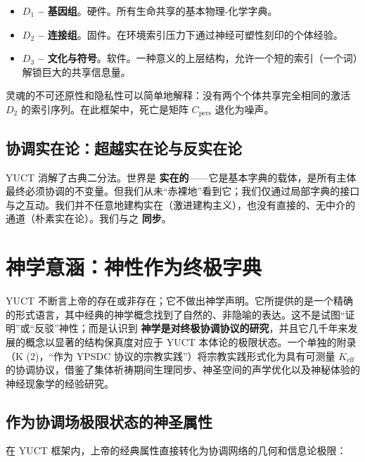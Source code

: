 \documentclass[12pt,a4paper]{article}
\begin{document}
	\begin{itemize}[leftmargin=*]
		\item \textbf{\(D_1\) – 基因组}。硬件。所有生命共享的基本物理-化学字典。
		\item \textbf{\(D_2\) – 连接组}。固件。在环境索引压力下通过神经可塑性刻印的个体经验。
		\item \textbf{\(D_3\) – 文化与符号}。软件。一种意义的上层结构，允许一个短的索引（一个词）解锁巨大的共享信息量。
	\end{itemize}
	
	灵魂的不可还原性和隐私性可以简单地解释：没有两个个体共享完全相同的激活 \(D_2\) 的索引序列。在此框架中，死亡是矩阵 \(C_{\mathrm{pers}}\) 退化为噪声。
	
	\subsection{协调实在论：超越实在论与反实在论}
	
	YUCT 消解了古典二分法。世界是 \textbf{实在的}——它是基本字典的载体，是所有主体最终必须协调的不变量。但我们从未“赤裸地”看到它；我们仅通过局部字典的接口与之互动。我们并不任意地建构实在（激进建构主义），也没有直接的、无中介的通道（朴素实在论）。我们与之 \textbf{同步}。
	
	\section{神学意涵：神性作为终极字典}
	\label{sec:theology}
	
	YUCT 不断言上帝的存在或非存在；它不做出神学声明。它所提供的是一个精确的形式语言，其中经典的神学概念找到了自然的、非隐喻的表达。这不是试图“证明”或“反驳”神性；而是认识到 \textbf{神学是对终极协调协议的研究}，并且它几千年来发展的概念以显著的结构保真度对应于 YUCT 本体论的极限状态。一个单独的附录（K (2)，“作为 YPSDC 协议的宗教实践”）将宗教实践形式化为具有可测量 \(K_{\mathrm{eff}}\) 的协调协议，借鉴了集体祈祷期间生理同步、神圣空间的声学优化以及神秘体验的神经现象学的经验研究。
	
	\subsection{作为协调场极限状态的神圣属性}
	
	在 YUCT 框架内，上帝的经典属性直接转化为协调网络的几何和信息论极限：
	
\end{document}
